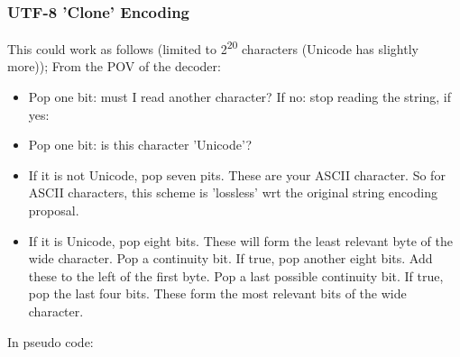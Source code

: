 \subsubsection{UTF-8 'Clone' Encoding}

This could work as follows
(limited to 2\textsuperscript{20} characters (Unicode has slightly more));
From the POV of the decoder:

\begin{itemize}
\item Pop one bit: must I read another character?
      If no: stop reading the string, if yes:
\item Pop one bit: is this character 'Unicode'?
\item If it is not Unicode, pop seven pits. These are your ASCII character.
      So for ASCII characters, this scheme is 'lossless' wrt the
      original string encoding proposal.
\item If it is Unicode, pop eight bits. These will form the least relevant
      byte of the wide character. Pop a continuity bit. If true, pop
      another eight bits. Add these to the left of the first byte.
      Pop a last possible continuity bit. If true, pop the last four bits.
      These form the most relevant bits of the wide character.
\end{itemize}

In pseudo code:

